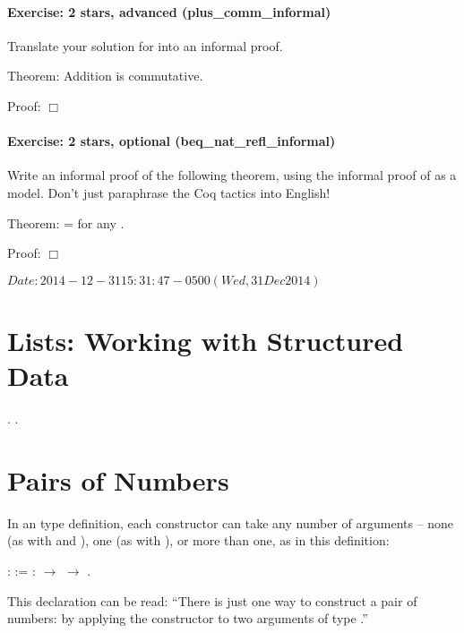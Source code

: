 \documentclass[12pt]{report}
\begin{document}
\paragraph{Exercise: 2 stars, advanced (plus\_comm\_informal)}

 Translate your solution for  into an informal proof. 

 Theorem: Addition is commutative.


    Proof:  \ensuremath{\Box} 

\paragraph{Exercise: 2 stars, optional (beq\_nat\_refl\_informal)}

 Write an informal proof of the following theorem, using the
    informal proof of  as a model.  Don't just
    paraphrase the Coq tactics into English!


    Theorem:  =    for any .


    Proof: \ensuremath{\Box} 

 $Date: 2014-12-31 15:31:47 -0500 (Wed, 31 Dec 2014) $ \begin{coqdoccode}
\end{coqdoccode}

\begin{coqdoccode}
\end{coqdoccode}
\section{Lists: Working with Structured Data}

\begin{coqdoccode}
\coqdocemptyline
\coqdocnoindent
{}  .\coqdoceol
\coqdocemptyline
\coqdocnoindent
{} .\coqdoceol
\coqdocemptyline
\end{coqdoccode}
\section{Pairs of Numbers}



 In an  type definition, each constructor can take
    any number of arguments -- none (as with  and ), one (as
    with ), or more than one, as in this definition: \begin{coqdoccode}
\coqdocemptyline
\coqdocnoindent
{}  :  :=\coqdoceol
\coqdocindent{1.00em}
 :  \ensuremath{\rightarrow}  \ensuremath{\rightarrow} .\coqdoceol
\coqdocemptyline
\end{coqdoccode}
This declaration can be read: ``There is just one way to
    construct a pair of numbers: by applying the constructor  to
    two arguments of type .'' 
\end{document}
